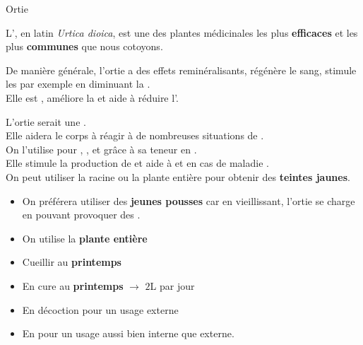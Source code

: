\label{ortie}
\renewcommand{\cita}{
    \phantom{a}\citer{La vérité était que la vie nous avait jetés aux orties, l'un et l'autre\ldots\\ et c'est toujours ce qu'on appelle une rencontre.}{\href{https://fr.wikipedia.org/wiki/Romain_Gary}{Romain Gary}}

}
\ficheidentiteplante
{Ortie}
{%
    L', en latin \textit{Urtica dioica}, est une des plantes médicinales les plus \textbf{efficaces} et les plus \textbf{communes} que nous cotoyons.

    De manière générale, l'ortie a des effets reminéralisants, régénère le sang, stimule les  par exemple en diminuant la .\\ 
    Elle est , améliore la  et aide à réduire l'.\\
}
{%
    L'ortie serait une . \\ Elle aidera le corps à réagir à de nombreuses situations de .\\
    On l'utilise pour , ,  et  grâce à sa teneur en .\\

    Elle stimule la production de  et aide à  et en cas de maladie .\\


    On peut utiliser la racine ou la plante entière pour obtenir des \textbf{teintes jaunes}.
}
{%
    \begin{itemize}[label=\faPen]
        \item On préférera utiliser des \textbf{jeunes pousses} car en vieillissant, l'ortie se charge en  pouvant provoquer des .
        \item On utilise la \textbf{plante entière}
        \item Cueillir au \textbf{printemps}
    \end{itemize}
}
{%
    \begin{itemize}[label = \bcplume]
        \item En cure au \textbf{printemps} $\longrightarrow$ $2$L par jour
        \item En décoction pour un usage externe
        \item En  pour un usage aussi bien interne que externe.
    \end{itemize}
}
